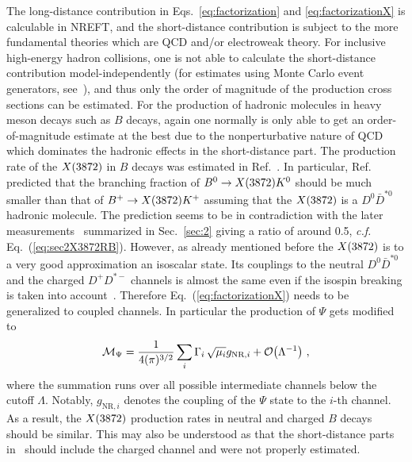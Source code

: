 The long-distance contribution in Eqs.~\eqref{eq:factorization} and
\eqref{eq:factorizationX} is calculable in
NREFT, and the short-distance contribution is subject to the more fundamental
theories which are QCD and/or electroweak theory.  For inclusive high-energy
hadron collisions, one is not able to calculate the short-distance contribution
model-independently (for estimates using Monte Carlo event generators,
see~\cite{Bignamini:2009sk,Artoisenet:2009wk,Bignamini:2009fn,Artoisenet:2010uu,
Esposito:2013ada,Guo:2013ufa,Guo:2014ppa,Guo:2014sca}), and thus
only the order of magnitude of the production
cross sections can be estimated. For
the production of hadronic molecules in heavy meson decays such as $B$ decays,
again one normally is only able to get an order-of-magnitude estimate at the
best due to the nonperturbative nature of QCD which dominates the hadronic
effects in the short-distance part.
The production rate of the $X(3872)$ in $B$ decays was estimated in
Ref.~\cite{Braaten:2004ai,Braaten:2004fk}. In particular,
Ref.~\cite{Braaten:2004ai} predicted
that the branching fraction of  $B^0\to X(3872) K^0$ should be much smaller than
that of  $B^+\to X(3872) K^+$ assuming that the $X(3872)$ is a $D^0\bar D^{*0}$
hadronic molecule. The prediction seems to be in contradiction with the later
measurements~\cite{Olive:2016xmw} summarized in Sec.~\ref{sec:2} giving a
ratio of around 0.5, {\sl c.f.} Eq.~(\ref{eq:sec2X3872RB}).
However, as already mentioned before the $X(3872)$ is to a very good approximation an isoscalar state.
Its couplings to the neutral $D^0\bar D^{*0}$ and the charged $D^+D^{*-}$
channels is almost the same even if the isospin breaking is taken into
account~\cite{Gamermann:2009fv,Guo:2014hqa}.
Therefore Eq.~(\ref{eq:factorizationX}) needs to be generalized to coupled channels.
In particular  the production of $\Psi$ gets modified to
\begin{equation}
  \mathcal{M}_\Psi
  = \frac{1}{4(\pi)^{3/2}} \sum_i \Gamma_i\,\sqrt{\mu_i} g_{\text{NR},i} +
\mathcal{O}\!\left(\Lambda^{-1}\right)\!\,\,,
  \label{eq:factorizationX_multichannel}
\end{equation}
where the summation runs over all possible intermediate channels below the
cutoff $\Lambda$. Notably,
$g_{\text{NR},i}$ denotes the coupling of the $\Psi$ state to the $i$-th
channel.  As a result, the $X(3872)$
production rates in neutral and charged $B$ decays should be similar. This may
also be understood as that the short-distance parts in~\cite{Braaten:2004ai}
should include the charged channel and were not properly estimated.




